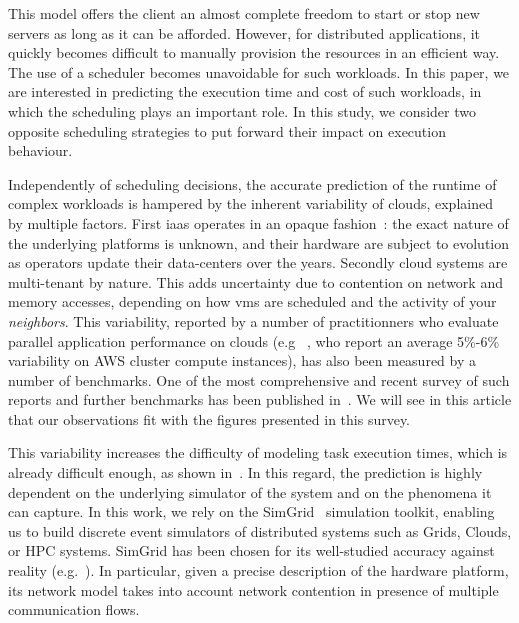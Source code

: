 \documentclass[]{llncs}
\begin{document}
This model  offers the client  an almost complete freedom  to start or  stop new
servers as long as it can be afforded. However, for distributed applications, it  
quickly  becomes  difficult  to manually  provision  the
resources in an  efficient way.  The use of a  scheduler becomes unavoidable for
such workloads.   In this paper, we  are interested in predicting  the execution
time  and cost  of such  workloads, in  which the  scheduling plays  an
important role.  In  this study, we consider two  opposite scheduling strategies
to put forward their impact on execution behaviour.


Independently of scheduling decisions, the accurate prediction of the runtime of
complex workloads is hampered by the inherent variability of clouds, explained
by multiple factors.  First \ac{iaas} operates  in an opaque fashion~: the exact
nature of the underlying platforms is unknown, and their hardware are subject to
evolution as operators update their data-centers over the years.  Secondly cloud
systems are multi-tenant  by nature. This adds uncertainty due  to contention on
network and  memory accesses, depending  on how  \acp{vm} are scheduled  and the
activity of  your \emph{neighbors}.  This  variability, reported by a  number of
practitionners  who evaluate  parallel  application performance  on clouds  (e.g
~\cite{MehrotraDHHJLSB16},  who report  an  average 5\%-6\%  variability on  AWS
cluster   compute  instances),   has  also   been  measured   by  a   number  of
benchmarks. One of the most comprehensive  and recent survey of such reports and
further benchmarks has been published in~\cite{LeitnerC16}. We will see in this 
article that our observations fit with the figures presented in this survey. 

This  variability increases  the difficulty  of modeling task execution  times,
which is  already difficult  enough, as  shown in~\cite{Lastovetsky05}.  In this
regard, the  prediction is highly dependent  on the underlying simulator  of the
system  and on  the phenomena  it can  capture.  In this  work, we  rely on  the
SimGrid~\cite{simgrid} simulation  toolkit, enabling us to  build discrete event
simulators of distributed systems such as Grids, Clouds, or HPC systems. SimGrid
has   been    chosen   for    its   well-studied   accuracy    against   reality
(e.g.~\cite{StanisicTLVM15,VelhoSCL13}).    In  particular,   given  a   precise
description  of the  hardware platform,  its  network model  takes into  account
network contention in presence of multiple communication flows.
\end{document}
